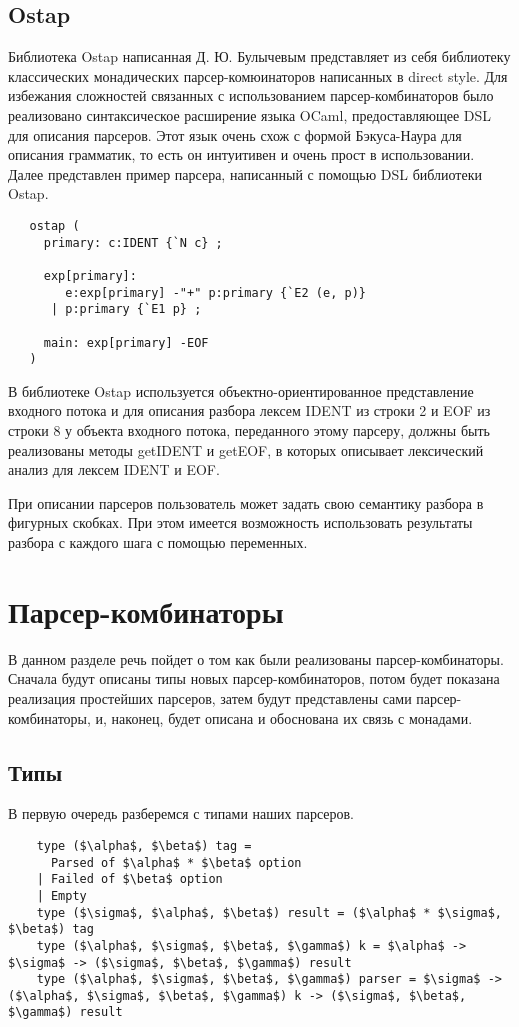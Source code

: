 \documentclass[conference]{IEEEtran}
\begin{document}
\subsection{Ostap}

Библиотека Ostap написанная Д. Ю. Булычевым представляет из себя библиотеку классических монадических парсер-комюинаторов написанных в direct style. Для избежания сложностей связанных с использованием парсер-комбинаторов было реализовано синтаксическое расширение языка OCaml, предоставляющее DSL для описания парсеров. Этот язык очень схож с формой Бэкуса-Наура для описания грамматик, то есть он интуитивен и очень прост в использовании. Далее представлен пример парсера, написанный с помощью DSL библиотеки Ostap.

\begin{lstlisting}
   ostap (
     primary: c:IDENT {`N c} ;

     exp[primary]:
        e:exp[primary] -"+" p:primary {`E2 (e, p)}
      | p:primary {`E1 p} ;

     main: exp[primary] -EOF
   )
  \end{lstlisting}

В библиотеке Ostap используется объектно-ориентированное представление входного потока и для описания разбора лексем IDENT из строки 2 и EOF из строки 8 у объекта входного потока, переданного этому парсеру, должны быть реализованы методы getIDENT и getEOF, в которых описывает лексический анализ для лексем IDENT и EOF.

При описании парсеров пользователь может задать свою семантику разбора в фигурных скобках. При этом имеется возможность использовать результаты разбора с каждого шага с помощью переменных.

\section{Парсер-комбинаторы}
В данном разделе речь пойдет о том как были реализованы парсер-комбинаторы. Сначала будут описаны типы новых парсер-комбинаторов, потом будет показана реализация простейших парсеров, затем будут представлены сами парсер-комбинаторы, и, наконец, будет описана и обоснована их связь с монадами.

\subsection{Типы}
В первую очередь разберемся с типами наших парсеров.

\begin{lstlisting}
    type ($\alpha$, $\beta$) tag =
      Parsed of $\alpha$ * $\beta$ option
    | Failed of $\beta$ option
    | Empty
    type ($\sigma$, $\alpha$, $\beta$) result = ($\alpha$ * $\sigma$, $\beta$) tag
    type ($\alpha$, $\sigma$, $\beta$, $\gamma$) k = $\alpha$ -> $\sigma$ -> ($\sigma$, $\beta$, $\gamma$) result
    type ($\alpha$, $\sigma$, $\beta$, $\gamma$) parser = $\sigma$ -> ($\alpha$, $\sigma$, $\beta$, $\gamma$) k -> ($\sigma$, $\beta$, $\gamma$) result
  \end{lstlisting}
  
\end{document}
